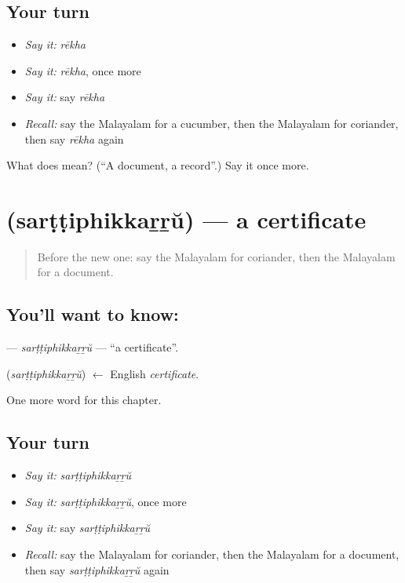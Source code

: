 \subsection*{Your turn}
\begin{itemize}
\raggedright
  \item \emph{Say it:} \emph{rēkha}
  \item \emph{Say it:} \emph{rēkha}, once more
  \item \emph{Say it:} say \emph{rēkha}
  \item \emph{Recall:} say the Malayalam for a cucumber, then the Malayalam for coriander, then say \emph{rēkha} again
\end{itemize}

\begin{tcolorbox}[breakable,colback=teal!4,colframe=teal!35!black,title={Before you move on}]
What does  mean? (\textquotedblleft{}A document, a record\textquotedblright{}.) Say it once more.
\end{tcolorbox}
\section[\texorpdfstring{\ml{സർട്ടിഫിക്കറ്റ്} (sarṭṭiphikkaṟṟŭ)}{സർട്ടിഫിക്കറ്റ് (sarṭṭiphikkaṟṟŭ)}]{ (sarṭṭiphikkaṟṟŭ) — a certificate}

\label{lesson:ML-C324-sarttiphikkarru}



\begin{quote}
Before the new one: say the Malayalam for coriander, then the Malayalam for a document.
\end{quote}

\subsection*{You'll want to know: }
\textbf{} — \emph{sarṭṭiphikkaṟṟŭ} — \textquotedblleft{}a certificate\textquotedblright{}.

\begin{cousinweb}
\textbf{} (\emph{sarṭṭiphikkaṟṟŭ}) $\leftarrow$ English \emph{certificate}.
\end{cousinweb}

\begin{grammarlens}[title={What you've built}]
One more word for this chapter.
\end{grammarlens}

\subsection*{Your turn}
\begin{itemize}
\raggedright
  \item \emph{Say it:} \emph{sarṭṭiphikkaṟṟŭ}
  \item \emph{Say it:} \emph{sarṭṭiphikkaṟṟŭ}, once more
  \item \emph{Say it:} say \emph{sarṭṭiphikkaṟṟŭ}
  \item \emph{Recall:} say the Malayalam for coriander, then the Malayalam for a document, then say \emph{sarṭṭiphikkaṟṟŭ} again
\end{itemize}

